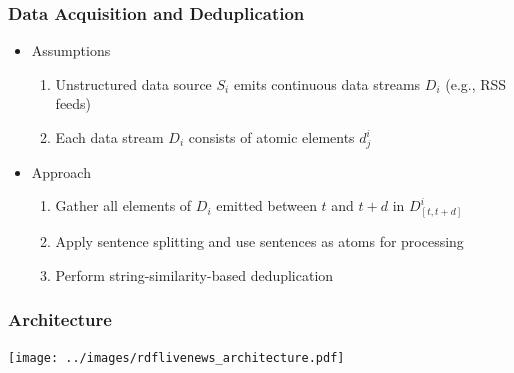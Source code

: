 \documentclass{beamer}
\begin{document}

\begin{frame}
   \frametitle{Data Acquisition and Deduplication}
\begin{itemize}
\item Assumptions
  \begin{enumerate}
        \item Unstructured data source $S_i$ emits continuous data streams $D_i$ (e.g., RSS feeds)
        \item Each data stream $D_i$ consists of atomic elements $d^i_j$        
    \end{enumerate}
\pause
\item Approach
\begin{enumerate}
\item Gather all elements of $D_i$ emitted between $t$ and $t+d$ in $D^i_{[t,t+d]}$
\item Apply sentence splitting and use sentences as atoms for processing
\item Perform string-similarity-based deduplication
\end{enumerate}
\end{itemize}
\end{frame}


\begin{frame}
    \frametitle{Architecture}
        \texttt{[image: ../images/rdflivenews\_architecture.pdf]}
\end{frame}

\end{document}
